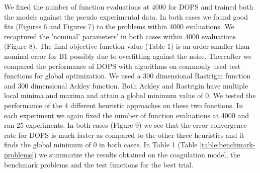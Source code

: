\documentclass[12pt]{article}
\begin{document}
We fixed the number of function evaluations at 4000 for DOPS and trained both the models against the pseudo experimental data. In both cases we found good fits  (Figures 6 and Figures 7) to the problems within 4000 evaluations. We recaptured the 'nominal' parameters' in both cases within 4000 evaluations (Figure 8). The final objective function value (Table 1) is an order smaller than nominal error for B1 possibly due to overfitting against the noise.  Thereafter we compared the performance of DOPS with algorithms on commonly used test functions for global optimization. We used a 300 dimensional Rastrigin function and 300 dimensional Ackley function. Both Ackley and Rastrigin have multiple local minima and maxima and attain a global minimum value of 0. We tested the performance of the 4 different heuristic approaches on these two functions. In each experiment we again fixed the number of function evaluations at 4000 and ran 25 experiments. In both cases (Figure 9) we see that the error convergence rate for DOPS is much faster as compared to the other three heuristics and it finds the global minimum of 0 in both cases. In Table 1 (Table \ref{table:benchmark-problems}) we summarize the results obtained on the coagulation model, the benchmark problems and the test functions for the best trial. 


\clearpage
\end{document}
